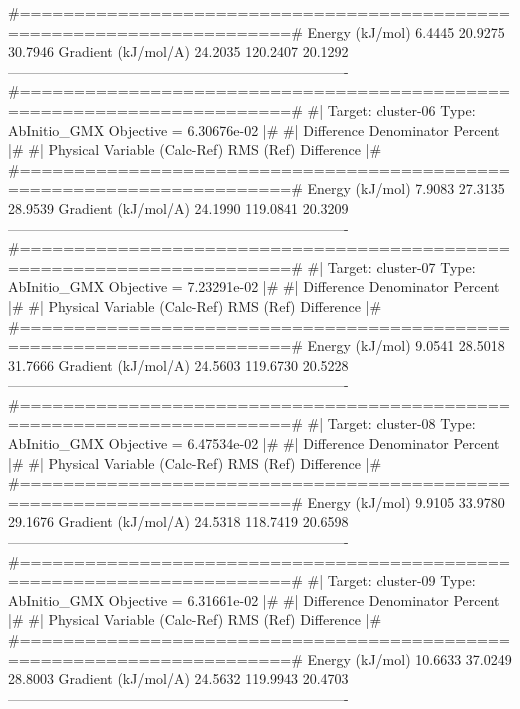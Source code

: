 \begin{DoxyVerb}
 #=======================================================================#
     Energy (kJ/mol)                 6.4445       20.9275     30.7946%
     Gradient (kJ/mol/A)            24.2035      120.2407     20.1292%
 -------------------------------------------------------------------------
 #=======================================================================#
 #|  Target: cluster-06 Type: AbInitio_GMX Objective = 6.30676e-02      |#
 #|                              Difference   Denominator     Percent   |#
 #|  Physical Variable           (Calc-Ref)     RMS (Ref)   Difference  |#
 #=======================================================================#
     Energy (kJ/mol)                 7.9083       27.3135     28.9539%
     Gradient (kJ/mol/A)            24.1990      119.0841     20.3209%
 -------------------------------------------------------------------------
 #=======================================================================#
 #|  Target: cluster-07 Type: AbInitio_GMX Objective = 7.23291e-02      |#
 #|                              Difference   Denominator     Percent   |#
 #|  Physical Variable           (Calc-Ref)     RMS (Ref)   Difference  |#
 #=======================================================================#
     Energy (kJ/mol)                 9.0541       28.5018     31.7666%
     Gradient (kJ/mol/A)            24.5603      119.6730     20.5228%
 -------------------------------------------------------------------------
 #=======================================================================#
 #|  Target: cluster-08 Type: AbInitio_GMX Objective = 6.47534e-02      |#
 #|                              Difference   Denominator     Percent   |#
 #|  Physical Variable           (Calc-Ref)     RMS (Ref)   Difference  |#
 #=======================================================================#
     Energy (kJ/mol)                 9.9105       33.9780     29.1676%
     Gradient (kJ/mol/A)            24.5318      118.7419     20.6598%
 -------------------------------------------------------------------------
 #=======================================================================#
 #|  Target: cluster-09 Type: AbInitio_GMX Objective = 6.31661e-02      |#
 #|                              Difference   Denominator     Percent   |#
 #|  Physical Variable           (Calc-Ref)     RMS (Ref)   Difference  |#
 #=======================================================================#
     Energy (kJ/mol)                10.6633       37.0249     28.8003%
     Gradient (kJ/mol/A)            24.5632      119.9943     20.4703%
 -------------------------------------------------------------------------

\end{DoxyVerb}
